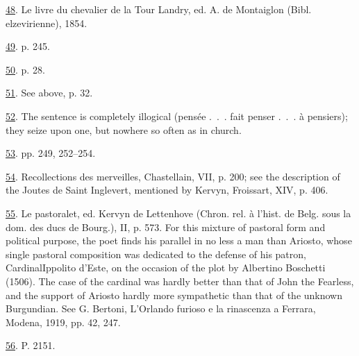 \protect\hypertarget{23_NOTES.xhtmlux5cux23id_1394}{\protect\hyperlink{11_Chapter_Four__THE_FORMS_OF_LOVE.xhtmlux5cux23id_1393}{48}}.
Le livre du chevalier de la Tour Landry, ed. A. de Montaiglon (Bibl.
elzevirienne), 1854.

\protect\hypertarget{23_NOTES.xhtmlux5cux23id_1392}{\protect\hyperlink{11_Chapter_Four__THE_FORMS_OF_LOVE.xhtmlux5cux23id_1391}{49}}.
p. 245.

\protect\hypertarget{23_NOTES.xhtmlux5cux23id_1390}{\protect\hyperlink{11_Chapter_Four__THE_FORMS_OF_LOVE.xhtmlux5cux23id_1389}{50}}.
p. 28.

\protect\hypertarget{23_NOTES.xhtmlux5cux23id_1388}{\protect\hyperlink{11_Chapter_Four__THE_FORMS_OF_LOVE.xhtmlux5cux23id_1387}{51}}.
See above, p. 32.

\protect\hypertarget{23_NOTES.xhtmlux5cux23id_1386}{\protect\hyperlink{11_Chapter_Four__THE_FORMS_OF_LOVE.xhtmlux5cux23id_1385}{52}}.
The sentence is completely illogical (pensée .~.~. fait penser .~.~. à
pensiers); they seize upon one, but nowhere so often as in church.

\protect\hypertarget{23_NOTES.xhtmlux5cux23id_1384}{\protect\hyperlink{11_Chapter_Four__THE_FORMS_OF_LOVE.xhtmlux5cux23id_1383}{53}}.
pp. 249, 252--254.

\protect\hypertarget{23_NOTES.xhtmlux5cux23id_1382}{\protect\hyperlink{11_Chapter_Four__THE_FORMS_OF_LOVE.xhtmlux5cux23id_1381}{54}}.
Recollections des merveilles, Chastellain, VII, p. 200; see the
description of the Joutes de Saint Inglevert, mentioned by Kervyn,
Froissart, XIV, p. 406.

\protect\hypertarget{23_NOTES.xhtmlux5cux23id_1380}{\protect\hyperlink{11_Chapter_Four__THE_FORMS_OF_LOVE.xhtmlux5cux23id_1379}{55}}.
Le pastoralet, ed. Kervyn de Lettenhove (Chron. rel. à l'hist. de Belg.
sous la dom. des ducs de Bourg.), II, p. 573. For this mixture of
pastoral form and political purpose, the poet finds his parallel in no
less a man than Ariosto, whose single pastoral composition was dedicated
to the defense of his patron,
Cardinal\protect\hypertarget{23_NOTES.xhtmlux5cux23page_414}{}{}Ippolito
d'Este, on the occasion of the plot by Albertino Boschetti (1506). The
case of the cardinal was hardly better than that of John the Fearless,
and the support of Ariosto hardly more sympathetic than that of the
unknown Burgundian. See G. Bertoni, L'Orlando furioso e la rinascenza a
Ferrara, Modena, 1919, pp. 42, 247.

\protect\hypertarget{23_NOTES.xhtmlux5cux23id_1378}{\protect\hyperlink{11_Chapter_Four__THE_FORMS_OF_LOVE.xhtmlux5cux23id_1377}{56}}.
P. 2151.

